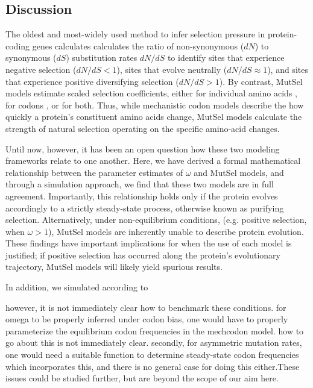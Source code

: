 \documentclass[11pt]{article}
\begin{document}
\subsection*{Discussion}
The oldest and most-widely used method to infer selection pressure in protein-coding genes calculates calculates the ratio of non-synonymous ($dN$) to synonymous ($dS$) substitution rates $dN/dS$ to identify sites that experience negative selection ($dN/dS<1$), sites that evolve neutrally ($dN/dS\approx1$), and sites that experience positive diversifying selection ($dN/dS>1$). By contrast, MutSel models estimate scaled selection coefficients, either for individual amino acids \cite{HalpernBruno1998,Bruno1996,Rodrigueetal2010,Tamurietal2012,Tamurietal2014}, for codons \cite{YangNielsen2008}, or for both. Thus, while mechanistic codon models describe the how quickly a protein's constituent amino acids change, MutSel models calculate the strength of natural selection operating on the specific amino-acid changes.  

Until now, however, it has been an open question how these two modeling frameworks relate to one another. Here, we have derived a formal mathematical relationship between the parameter estimates of $\omega$ and MutSel models, and through a simulation approach, we find that these two models are in full agreement. Importantly, this relationship holds only if the protein evolves accordingly to a strictly steady-state process, otherwise known as purifying selection. Alternatively, under non-equilibrium conditions, (e.g. positive selection, when $\omega > 1$), MutSel models are inherently unable to describe protein evolution. These findings have important implications for when the use of each model is justified; if positive selection has occurred along the protein's evolutionary trajectory, MutSel models will likely yield spurious results.

In addition, we simulated according to 

however, it is not immediately clear how to benchmark these conditions. for omega to be properly inferred under codon bias, one would have to properly parameterize the equilibrium codon frequencies in the mechcodon model. how to go about this is not immediately clear.
secondly, for asymmetric mutation rates, one would need a suitable function to determine steady-state codon frequencies which incorporates this, and there is no general case for doing this either.These issues could be studied further, but are beyond the scope of our aim here. 
\end{document}
